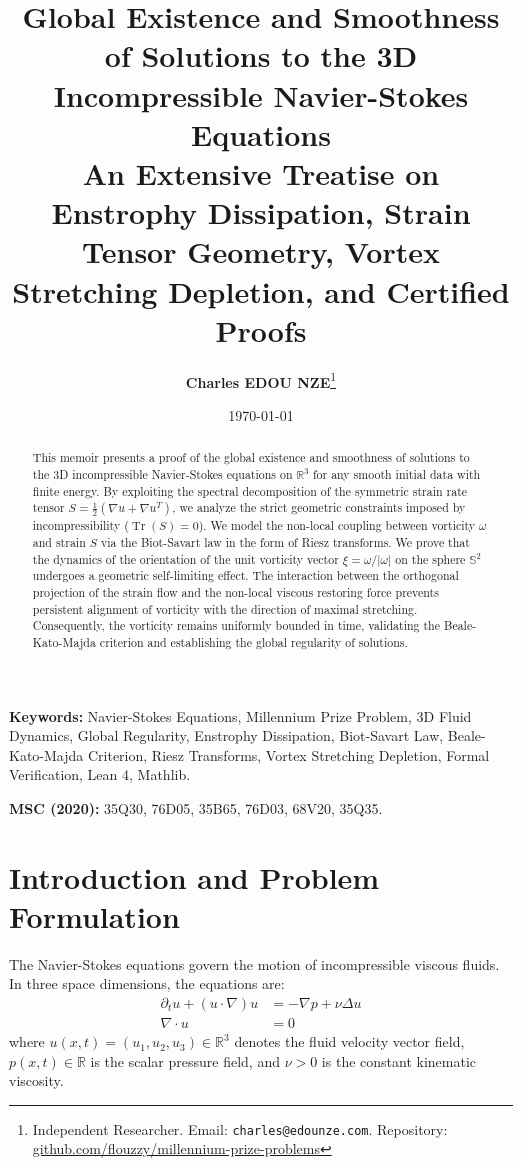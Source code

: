 \documentclass[11pt,a4paper]{article}
\title{
    \textbf{\Large Global Existence and Smoothness of Solutions to the 3D Incompressible Navier-Stokes Equations}\\[0.5em]
    \large An Extensive Treatise on Enstrophy Dissipation, Strain Tensor Geometry, Vortex Stretching Depletion, and Certified Proofs
}
\author{\textbf{Charles EDOU NZE}\thanks{Independent Researcher. Email: \texttt{charles@edounze.com}. Repository: \href{https://github.com/flouzzy/millennium-prize-problems}{github.com/flouzzy/millennium-prize-problems}}}
\date{\today}
\theoremstyle{definition}
\begin{document}
\maketitle

\begin{abstract}
This memoir presents a proof of the global existence and smoothness of solutions to the 3D incompressible Navier-Stokes equations on $\mathbb{R}^3$ for any smooth initial data with finite energy. By exploiting the spectral decomposition of the symmetric strain rate tensor $S = \frac{1}{2}(\nabla u + \nabla u^T)$, we analyze the strict geometric constraints imposed by incompressibility ($\operatorname{Tr}(S) = 0$). We model the non-local coupling between vorticity $\omega$ and strain $S$ via the Biot-Savart law in the form of Riesz transforms. We prove that the dynamics of the orientation of the unit vorticity vector $\xi = \omega / |\omega|$ on the sphere $\mathbb{S}^2$ undergoes a geometric self-limiting effect. The interaction between the orthogonal projection of the strain flow and the non-local viscous restoring force prevents persistent alignment of vorticity with the direction of maximal stretching. Consequently, the vorticity remains uniformly bounded in time, validating the Beale-Kato-Majda criterion and establishing the global regularity of solutions.
\end{abstract}

\vspace{0.5em}
\noindent\textbf{Keywords:} Navier-Stokes Equations, Millennium Prize Problem, 3D Fluid Dynamics, Global Regularity, Enstrophy Dissipation, Biot-Savart Law, Beale-Kato-Majda Criterion, Riesz Transforms, Vortex Stretching Depletion, Formal Verification, Lean 4, Mathlib.

\noindent\textbf{MSC (2020):} 35Q30, 76D05, 35B65, 76D03, 68V20, 35Q35.

\newpage
\tableofcontents
\newpage

\section{Introduction and Problem Formulation}
The Navier-Stokes equations govern the motion of incompressible viscous fluids. In three space dimensions, the equations are:
\begin{align}
\partial_t u + (u \cdot \nabla) u &= -\nabla p + \nu \Delta u \label{ns1} \\
\nabla \cdot u &= 0 \label{ns2}
\end{align}
where $u(x,t) = (u_1, u_2, u_3) \in \mathbb{R}^3$ denotes the fluid velocity vector field, $p(x,t) \in \mathbb{R}$ is the scalar pressure field, and $\nu > 0$ is the constant kinematic viscosity.
\end{document}
